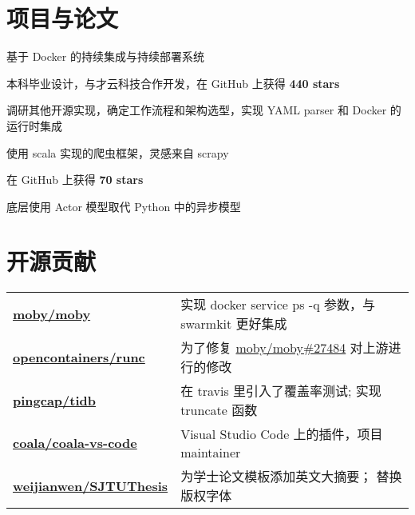 \documentclass[]{deedy-resume-openfont}
\begin{document}
\begin{minipage}[t]{0.73\textwidth}
    
    \section{项目与论文}
    \sectionsep
    \begin{tightemize}
        \item 基于 Docker 的持续集成与持续部署系统
        \item 本科毕业设计，与才云科技合作开发，在 GitHub 上获得 \textbf{440 stars}
        \item 调研其他开源实现，确定工作流程和架构选型，实现 YAML parser 和 Docker 的运行时集成
        \end{tightemize}
    \sectionsep
    
    \begin{tightemize}
        \item 使用 scala 实现的爬虫框架，灵感来自 scrapy
        \item 在 GitHub 上获得 \textbf{70 stars}
        \item 底层使用 Actor 模型取代 Python 中的异步模型
        \end{tightemize}
    \sectionsep


    \section{开源贡献}
    \begin{tabular}{ll}
    \href{https://github.com/moby/moby/commits?author=gaocegege}{\bf moby/moby} & 实现 docker service ps -q 参数，与 swarmkit 更好集成 \\
    \href{https://github.com/opencontainers/runc/commits?author=gaocegege}{\bf opencontainers/runc} & 为了修复 \href{https://github.com/moby/moby/issues/27484}{moby/moby\#27484} 对上游进行的修改 \\
    \href{https://github.com/pingcap/tidb/commits?author=gaocegege}{\bf pingcap/tidb} & 在 travis 里引入了覆盖率测试; 实现 truncate 函数 \\
    \href{https://github.com/coala/coala-vs-code/commits/master?author=gaocegege}{\bf coala/coala-vs-code} & Visual Studio Code 上的插件，项目 maintainer \\
    \href{https://github.com/weijianwen/SJTUThesis/commits?author=gaocegege}{\bf weijianwen/SJTUThesis} & 为学士论文模板添加英文大摘要； 替换版权字体 \\
    \end{tabular}
    \sectionsep
    

\end{minipage}
\end{document}
